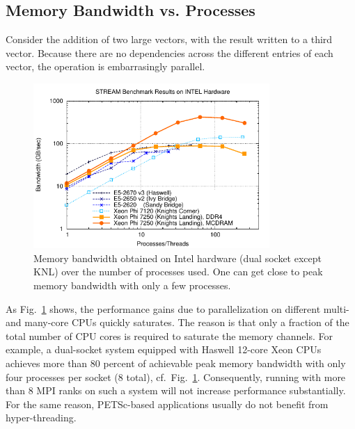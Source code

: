 {{\subsection{Memory Bandwidth vs. Processes} \label{subsec:bandwidth-vs-processes}
Consider the addition of two large vectors, with the result written to a third vector.
Because there are no dependencies across the different entries of each vector, the operation is embarrasingly parallel.

\begin{figure}[tb]
\centerline{ \includegraphics[width=0.8\textwidth]{stream-results-intel}}
\caption{Memory bandwidth obtained on Intel hardware (dual socket except KNL) over the number of processes used.
         One can get close to peak memory bandwidth with only a few processes.}
\label{fig_stream_intel}
\end{figure}

As Fig.~\ref{fig_stream_intel} shows, the performance gains due to parallelization on different multi- and many-core CPUs quickly saturates.
The reason is that only a fraction of the total number of CPU cores is required to saturate the memory channels.
For example, a dual-socket system equipped with Haswell 12-core Xeon CPUs achieves more than 80 percent of achievable peak memory bandwidth with only four processes per socket (8 total), cf.~Fig.~\ref{fig_stream_intel}.
Consequently, running with more than 8 MPI ranks on such a system will not increase performance substantially.
For the same reason, PETSc-based applications usually do not benefit from hyper-threading.

}}
